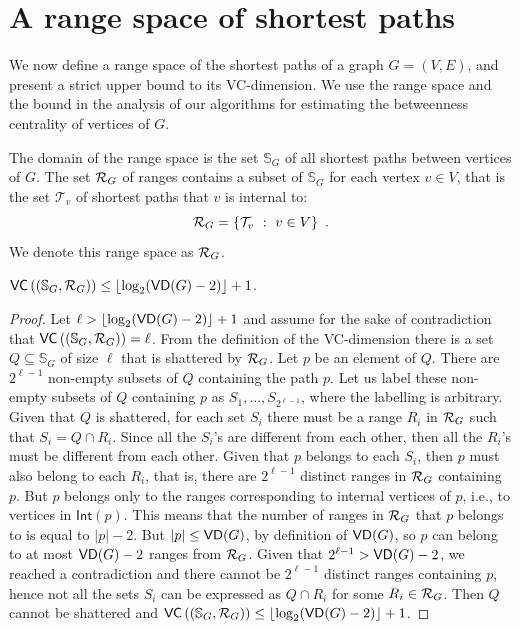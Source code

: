 \section{A range space of shortest paths}\label{sec:centrsamplrangeset}
We now define a range space of the shortest paths of a graph $G=(V,E)$, and present 
a strict upper bound to its VC-dimension. %
We use the range space and the bound in the analysis of our algorithms for estimating
the betweenness centrality of vertices of $G$.

The domain of the range space is the set $\mathbb{S}_G$ of all shortest
paths between vertices of $G$. The set $\mathcal{R}_G$ of ranges contains a subset of
$\mathbb{S}_G$ for each vertex $v\in V$, that is the set $\mathcal{T}_v$ of
shortest paths that $v$ is internal to:
\[
\mathcal{R}_G = \{\mathcal{T}_v ~:~ v\in V\}\enspace.
\]
We denote this range space as $\mathcal{R}_G$.

\begin{lemma}\label{lem:vcdimuppbound}
  $\mathsf{VC}\left((\mathbb{S}_G,\mathcal{R}_G)\right)\le\lfloor\log_2(\mathsf{VD}(G)-2)\rfloor+1$.
\end{lemma}

\begin{proof}
Let $\ell>\lfloor\log_2(\mathsf{VD}(G)-2)\rfloor+1$ and assume for the sake of contradiction
that $\mathsf{VC}\left((\mathbb{S}_G,\mathcal{R}_G)\right)=\ell$. From the definition of the VC-dimension there is a set
$Q\subseteq\mathbb{S}_G$ of size $\ell$ that is shattered by $\mathcal{R}_G$. Let $p$ be
an element of $Q$. There are  $2^{\ell-1}$ non-empty subsets of
$Q$ containing the path $p$. Let us label these non-empty subsets of $Q$ containing $p$ as
$S_1,\dotsc,S_{2^{\ell-1}}$, where the labelling is arbitrary.
Given that $Q$ is shattered, for each set $S_i$ there must be a range $R_i$ in
$\mathcal{R}_G$ such that $S_i=Q\cap R_i$. Since all the $S_i$'s are
different from each other, then all the $R_i$'s must be different from each
other. Given that $p$ belongs to each $S_i$, then $p$ must also belong to each
$R_i$, that is, there are $2^{\ell-1}$ distinct ranges in $\mathcal{R}_G$ containing
$p$. But $p$ belongs only to the ranges corresponding to internal vertices of
$p$, i.e., to vertices in $\mathsf{Int}(p)$. This means that the number of ranges
in $\mathcal{R}_G$ that $p$ belongs to is equal to $|p|-2$. But $|p|\le\mathsf{VD}(G)$, by
definition of $\mathsf{VD}(G)$, so $p$
can belong to at most $\mathsf{VD}(G)-2$ ranges from $\mathcal{R}_G$. Given that
$2^{\ell-1}>\mathsf{VD}(G)-2$, we reached a contradiction and there cannot be $2^{\ell-1}$
distinct ranges containing $p$, hence not all the sets $S_i$ can be expressed as
$Q\cap R_i$ for some $R_i\in\mathcal{R}_G$. Then $Q$ cannot be shattered and
$\mathsf{VC}\left((\mathbb{S}_G,\mathcal{R}_G\right))\le\lfloor\log_2(\mathsf{VD}(G)-2)\rfloor+1$.%
\end{proof}

